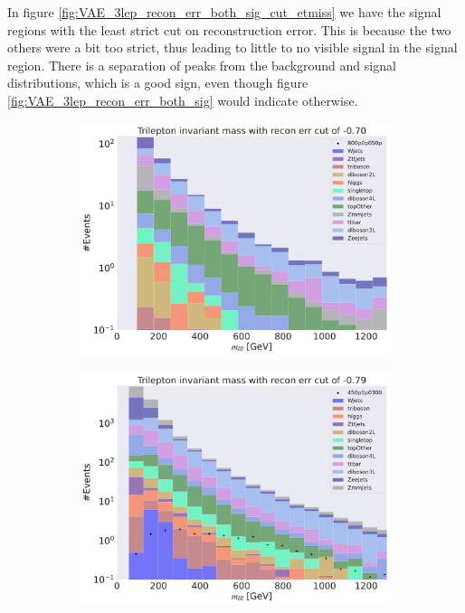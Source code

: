 In figure \ref{fig:VAE_3lep_recon_err_both_sig_cut_etmiss} we have the signal regions with the least strict cut on reconstruction error. 
This is because the two others were a bit too strict, thus leading to little to no visible signal in the signal region. There is a 
separation of peaks from the background and signal distributions, which is a good sign, even though figure \ref{fig:VAE_3lep_recon_err_both_sig}
would indicate otherwise. 

\begin{figure}[H]
    \centering
    \begin{subfigure}{.45\textwidth}
        \includegraphics[width=\textwidth]{Figures/VAE_testing/big/3lep/b_data_recon_big_rm3_feats_sig_800p0p050p_mlll_recon_errcut_-0.78.pdf}
        \caption{ }
        \label{fig:VAE_3lep_big_450_cut_mlll}
    \end{subfigure}
    \hfill
    \begin{subfigure}{.45\textwidth}
        \includegraphics[width=\textwidth]{Figures/VAE_testing/small/3lep/b_data_recon_big_rm3_feats_sig_450p0p0300_mlll_recon_errcut_-0.79.pdf}

\end{subfigure}
\end{figure}
